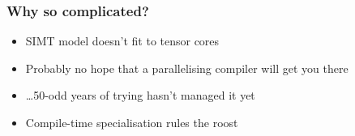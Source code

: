 \documentclass[aspectratio=169]{beamer}
\begin{document}
\begin{frame}[fragile]
\end{frame}

\begin{frame}
  \frametitle{Why so complicated?}
  \begin{itemize}
  \item SIMT model doesn't fit to tensor cores
  \item Probably no hope that a parallelising compiler will get you
    there
  \item \dots 50-odd years of trying hasn't managed it yet
  \item Compile-time specialisation rules the roost
  \end{itemize}
\end{frame}
\end{document}

